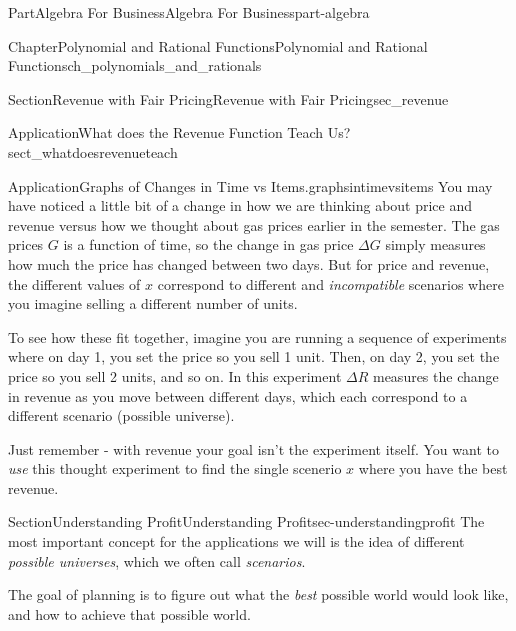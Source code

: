 \documentclass[oneside,10pt,]{tufte-book}
\numberwithin{equation}{chapter}
\def \tikzhistogram (#1,#2){\draw[fill=blue,opacity=0.3] ({#1+((\xtwo-\xmin)/5)},#2) rectangle ({#1-((\xtwo-\xmin)/5)},0); \draw[draw,thick] ({#1+((\xtwo-\xmin)/5)},#2) rectangle ({#1-((\xtwo-\xmin)/5)},0); \node[draw,fill=blue, circle,inner sep=2.5pt] at (#1,#2) {};}
\begin{document}
\begin{partptx}{Part}{Algebra For Business}{}{Algebra For Business}{}{}{part-algebra}
\begin{chapterptx}{Chapter}{Polynomial and Rational Functions}{}{Polynomial and Rational Functions}{}{}{ch_polynomials_and_rationals}
\begin{sectionptx}{Section}{Revenue with Fair Pricing}{}{Revenue with Fair Pricing}{}{}{sec_revenue}
\begin{insight}{Application}{What does the Revenue Function Teach Us?}{sect_whatdoesrevenueteach}
\begin{image}{0}{1}{0}{}
{
}%
\end{image}%
\end{insight}
\begin{insight}{Application}{Graphs of Changes in Time vs Items.}{graphsintimevsitems}%
You may have noticed a little bit of a change in how we are thinking about price and revenue versus how we thought about gas prices earlier in the semester. The gas prices \(G\) is a function of time, so the change in gas price \(\Delta G\) simply measures how much the price has changed between two days. But for price and revenue, the different values of \(x\) correspond to different and \emph{incompatible} scenarios where you imagine selling a different number of units.%
\par
To see how these fit together, imagine you are running a sequence of experiments where on day 1, you set the price so you sell 1 unit. Then, on day 2, you set the price so you sell 2 units, and so on. In this experiment \(\Delta R\) measures the change in revenue as you move between different days, which each correspond to a different scenario (possible universe).%
\par
Just remember - with revenue your goal isn't the experiment itself. You want to \emph{use} this thought experiment to find the single scenerio \(x\) where you have the best revenue.%
\end{insight}
\end{sectionptx}
%
%
\typeout{************************************************}
\typeout{************************************************}
%
\begin{sectionptx}{Section}{Understanding Profit}{}{Understanding Profit}{}{}{sec-understandingprofit}
The most important concept for the applications we will is the idea of different \emph{possible universes}, which we often call \emph{scenarios}.%
\par
The goal of planning is to figure out what the \emph{best} possible world would look like, and how to achieve that possible world.%

\end{sectionptx}
\end{chapterptx}
\end{partptx}
\end{document}
